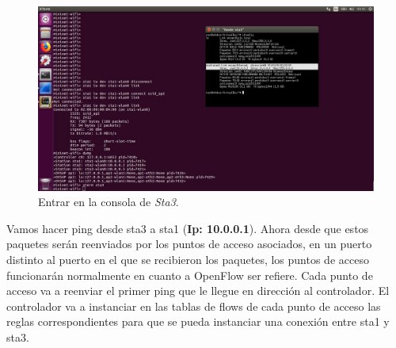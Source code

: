 \begin{figure}[!htb]
  \centering
    \includegraphics[width=\linewidth]{./img/14.JPG}
    \caption{Entrar en la consola de \textit{Sta3}.}
  \label{fig:yo}
\end{figure}
\newline
Vamos hacer ping desde sta3 a sta1 (\textbf{Ip: 10.0.0.1}). Ahora desde que estos paquetes serán reenviados por los puntos de acceso asociados, en un puerto distinto al puerto
en el que se recibieron los paquetes, los puntos de acceso funcionarán normalmente en cuanto a OpenFlow ser refiere. Cada punto de acceso va a reenviar el primer ping que le llegue en dirección al controlador. El controlador va a instanciar en las tablas de flows de cada punto de acceso las reglas correspondientes para que se pueda instanciar una conexión entre sta1 y sta3. \newline

